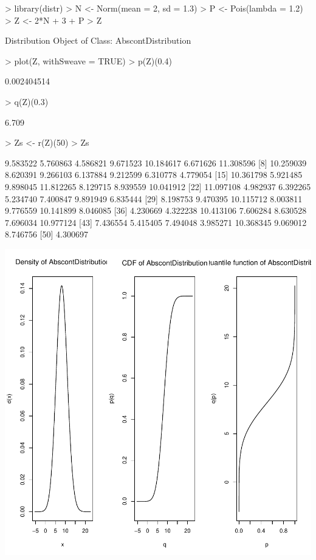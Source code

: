 \documentclass[11pt]{article}
\begin{document}
\begin{Schunk}
\begin{Sinput}
> library(distr)
> N <- Norm(mean = 2, sd = 1.3)
> P <- Pois(lambda = 1.2)
> Z <- 2*N + 3 + P
> Z
\end{Sinput}
\begin{Soutput}
Distribution Object of Class: AbscontDistribution
\end{Soutput}
\begin{Sinput}
> plot(Z, withSweave = TRUE)
> p(Z)(0.4)
\end{Sinput}
\begin{Soutput}
[1] 0.002404514
\end{Soutput}
\begin{Sinput}
> q(Z)(0.3)
\end{Sinput}
\begin{Soutput}
[1] 6.709
\end{Soutput}
\begin{Sinput}
> Zs <- r(Z)(50)
> Zs
\end{Sinput}
\begin{Soutput}
 [1]  9.583522  5.760863  4.586821  9.671523 10.184617  6.671626 11.308596
 [8] 10.259039  8.620391  9.266103  6.137884  9.212599  6.310778  4.779054
[15] 10.361798  5.921485  9.898045 11.812265  8.129715  8.939559 10.041912
[22] 11.097108  4.982937  6.392265  5.234740  7.400847  9.891949  6.835444
[29]  8.198753  9.470395 10.115712  8.003811  9.776559 10.141899  8.046085
[36]  4.230669  4.322238 10.413106  7.606284  8.630528  7.696034 10.977124
[43]  7.436554  5.415405  7.494048  3.985271 10.368345  9.069012  8.746756
[50]  4.300697
\end{Soutput}
\end{Schunk}
\includegraphics{distr-exam1}
\end{document}
